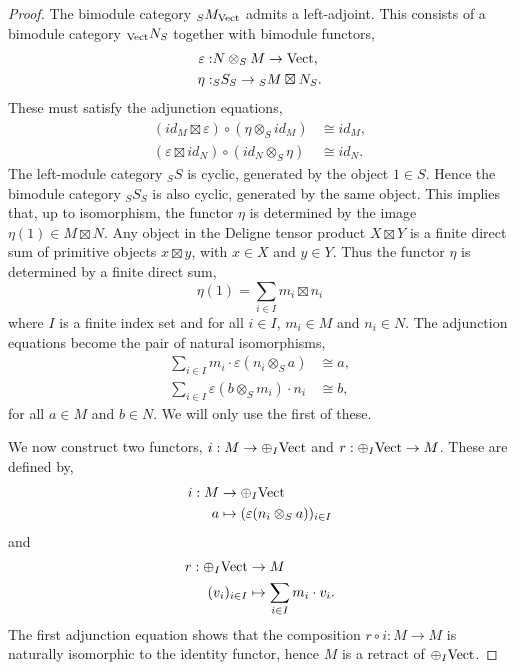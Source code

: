 \documentclass{amsart}
\begin{document}
\begin{proof}
	The bimodule category ${}_S M_{\mathrm{Vect}}$ admits a left-adjoint. This consists of a bimodule category ${}_{\mathrm{Vect}}N_S$ together with bimodule functors,
	\begin{align*}
		\varepsilon: & N \otimes_S M \to \mathrm{Vect}, \\
		\eta: & {}_S S_S \to {}_S M \boxtimes N_S. 
	\end{align*}
	These must satisfy the adjunction equations,
	\begin{align*}
		(id_M \boxtimes \varepsilon) \circ (\eta \otimes_S id_M) &\cong id_M, \\
		(\varepsilon \boxtimes id_N) \circ (id_N \otimes_S \eta) & \cong id_N.
	\end{align*}
	The left-module category ${}_S S$ is cyclic, generated by the object $1 \in S$. Hence the bimodule category ${}_S S_S$ is also cyclic, generated by the same object. This implies that, up to isomorphism, the functor $\eta$ is determined by the image $\eta(1) \in M \boxtimes N $. Any object in the Deligne tensor product $X \boxtimes Y$ is a finite direct sum of primitive objects $x \boxtimes y$, with $x \in X$ and $y \in Y$. Thus the functor $\eta$ is determined by a finite direct sum,
	\begin{equation*}
		\eta(1) = \sum_{i \in I} m_i \boxtimes n_i 
	\end{equation*} 
	where $I$ is a finite index set and for all $i \in I$,  $m_i \in M$ and $n_i \in N$. The adjunction equations become the pair of natural isomorphisms,
	\begin{align*}
		\sum_{i \in I} m_i \cdot \varepsilon(n_i \otimes_S a) & \cong a, \\
		\sum_{i \in I} \varepsilon(b \otimes_S m_i) \cdot n_i & \cong b,
	\end{align*}
	for all $a \in M$ and $b \in N$. We will only use the first of these. 
	
We now construct two functors, $i: M \to \oplus_I \mathrm{Vect}$ and $r: \oplus_I \mathrm{Vect} \to M$. These are defined by,
\begin{align*}
	i: M & \to \oplus_I \mathrm{Vect} \\
	a & \mapsto (\varepsilon(n_i \otimes_S a) )_{i \in I}
\end{align*}	
and 
\begin{align*}
	r: \oplus_I \mathrm{Vect} & \to M \\
	(v_i)_{i \in I} & \mapsto \sum_{i \in I} m_i \cdot v_i.
\end{align*}	
The first adjunction equation shows that the composition $r \circ i: M \to M$ is naturally isomorphic to the identity functor, hence $M$ is a retract of $\oplus_I \mathrm{Vect}$.      
\end{proof}
\end{document}
